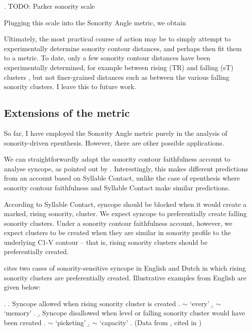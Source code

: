 \documentclass[12pt]{article}
\begin{document}
\ex. TODO: Parker sonority scale

Plugging this scale into the {\sc Sonority Angle} metric, we obtain %

\bigskip

Ultimately, the most practical course of action may be to simply attempt to experimentally determine sonority contour distances, and perhaps then fit them to a metric. To date, only a few sonority contour distances have been experimentally determined, for example between rising (TR) and falling (sT) clusters \citep{fleischhacker.2002}, but not finer-grained distances such as between the various falling sonority clusters. I leave this to future work.

\bigskip

\subsection{Extensions of the metric}

So far, I have employed the {\sc Sonority Angle} metric purely in the analysis of sonority-driven epenthesis. However, there are other possible applications.

\bigskip

 We can straightforwardly adapt the sonority contour faithfulness account to analyse syncope, as pointed out by \citet{flemming.2008}. Interestingly, this makes different predictions from an account based on Syllable Contact, unlike the case of epenthesis where sonority contour faithfulness and Syllable Contact make similar predictions. 

According to Syllable Contact, syncope should be blocked when it would create a marked, rising sonority, cluster. We expect syncope to preferentially create falling sonority clusters. Under a sonority contour faithfulness account, however, we expect clusters to be created when they are similar in sonority profile to the underlying C1-V contour -- that is, rising sonority clusters should be preferentially created.

\citet{flemming.2008} cites two cases of sonority-sensitive syncope in English and Dutch in which rising sonority clusters are preferentially created. Illustrative examples from English are given below:

\ex. \a. Syncope allowed when rising sonority cluster is created
     \a.  $\sim$  `every'
     \b.  $\sim$  `memory'
     \z.
     \b. Syncope disallowed when level or falling sonority cluster would have been created
     \a.  $\sim$  `picketing'
     \b.  $\sim$  `capacity'
     \z.
     (Data from \citep{hooper.1978}, cited in \citep{flemming.2008})
\end{document}
